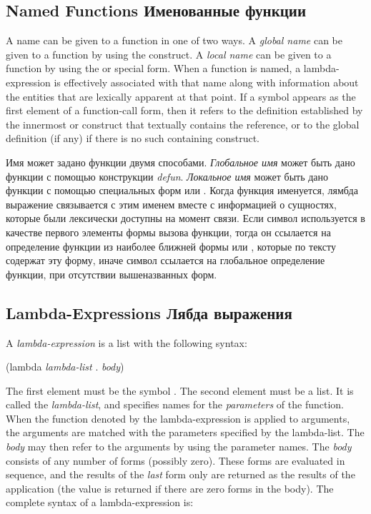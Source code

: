 \subsection{Named Functions Именованные функции}

A name can be given to a function in one of two ways.
A \textit{global name} can be given to a function by using the
 construct.
A \textit{local name} can be given to a function by using the
 or
 special form.
When a function is named, a lambda-expression is effectively
associated with that name
along with information about the entities that are lexically apparent
at that point.
If a symbol appears as the first element of a function-call form, then it
refers to the definition established by the innermost  or 
construct that textually contains the reference, or to the global
definition (if any) if there is no such containing construct.

Имя может задано функции двумя способами.
\textit{Глобальное имя} может быть дано функции с помощью конструкции
\textit{defun}.
\textit{Локальное имя} может быть дано функции с помощью специальных форм
 или .
Когда функция именуется, лямбда выражение связывается с этим именем вместе с
информацией о сущностях, которые были лексически доступны на момент связи.
Если символ используется в качестве первого элементы формы вызова функции, тогда
он ссылается на определение функции из наиболее ближней формы  или
, которые по тексту содержат эту форму, иначе символ ссылается на
глобальное определение функции, при отсутствии вышеназванных форм.

\subsection{Lambda-Expressions Лябда выражения}
\label{LAMBDA-EXPRESSIONS-SECTION}

A \textit{lambda-expression} is a list with the following syntax:
\begin{lisp}
(lambda \textit{lambda-list} . \textit{body})
\end{lisp}
The first element must be the symbol .  The second element
must be a list.  It is called the \textit{lambda-list}, and specifies
names for the \textit{parameters} of the function.  When the function
denoted by the lambda-expression is applied to arguments,
the arguments are matched with the parameters specified by the
lambda-list.  The \textit{body} may then refer to the arguments by using
the parameter names.  The \textit{body} consists of any number of
forms (possibly zero).  These forms are evaluated in sequence,
and the results of the \textit{last} form only are returned as the results
of the application (the value {\false} is returned if there are zero
forms in the body).
The complete syntax of a lambda-expression is:

